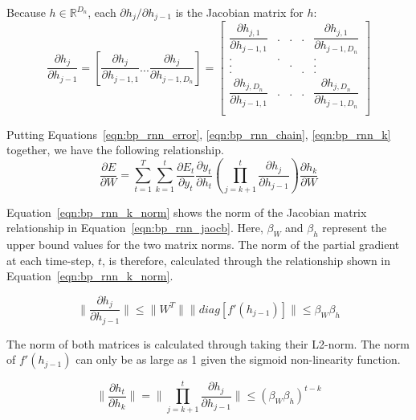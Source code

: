 \documentclass{tufte-handout}
\begin{document}
Because $h \in \mathbb{R}^{D_n}$, each $\partial h_j/\partial h_{j-1}$ is the Jacobian matrix for $h$:
\begin{equation}
	\dfrac{\partial h_j}{\partial h_{j-1}} = {[\dfrac{\partial h_{j}}{\partial h_{j-1,1}} ...  \dfrac{\partial h_{j}}{\partial h_{j-1,D_n}}]} = 
	\begin{bmatrix}
	\dfrac{\partial h_{j,1}}{\partial h_{j-1,1}} & . & . & . & \dfrac{\partial h_{j,1}}{\partial h_{j-1,D_n}} \\
	. & . & & & . \\
	. & & . & & . \\
	. & & & . & . \\
	\dfrac{\partial h_{j,D_n}}{\partial h_{j-1,1}} & . & . & . & \dfrac{\partial h_{j,D_n}}{\partial h_{j-1,D_n}} \\
	\end{bmatrix}
	\label{eqn:bp_rnn_jaocb}
\end{equation}

Putting Equations~\ref{eqn:bp_rnn_error}, \ref{eqn:bp_rnn_chain}, \ref{eqn:bp_rnn_k} together, we have the following relationship.
\begin{equation}
	\dfrac{\partial E}{\partial W} = \sum_{t=1}^{T}\sum_{k=1}^{t} \dfrac{\partial E_t}{\partial y_t} \dfrac{\partial y_t}{\partial h_t} (\prod_{j=k+1}^{t}\dfrac{\partial h_j}{\partial h_{j-1}}) \dfrac{\partial h_k}{\partial W}
\end{equation}

Equation~\ref{eqn:bp_rnn_k_norm} shows the norm of the Jacobian matrix relationship in Equation~\ref{eqn:bp_rnn_jaocb}. Here, $\beta_W$ and $\beta_h$ represent the upper bound values for the two matrix norms. The norm of the partial gradient at each time-step, $t$, is therefore, calculated through the relationship shown in Equation~\ref{eqn:bp_rnn_k_norm}.

\begin {equation}
	\parallel \dfrac{\partial h_j}{\partial h_{j-1}} \parallel \leq \parallel W^T\parallel  \parallel diag [f'(h_{j-1})]\parallel \leq \beta_W \beta_h
	\label{eqn:bp_rnn_k_norm}
\end {equation}

The norm of both matrices is calculated through taking their L2-norm. The norm of $f'(h_{j-1})$ can only be as large as 1 given the sigmoid non-linearity function.

\begin {equation}
	\parallel \dfrac{\partial h_t}{\partial h_k} \parallel = \parallel \prod_{j=k+1}^{t} \dfrac{\partial h_j}{\partial h_{j-1}}\parallel \leq (\beta_W \beta_h)^{t-k}
	\label{eqn:bp_rnn_k_norm_total}
\end {equation}
\end{document}
